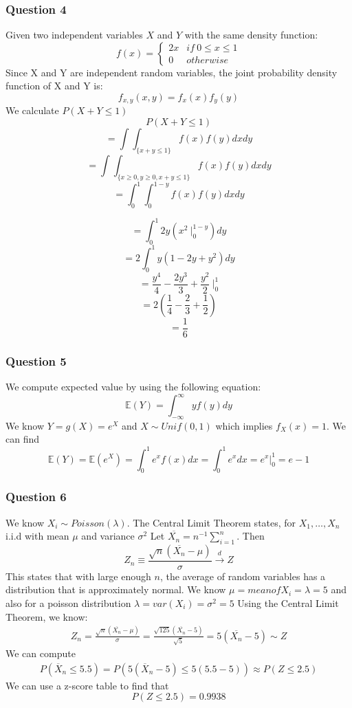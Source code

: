 \documentclass{article}
\begin{document}
\subsubsection*{Question 4}
Given two independent variables $X$ and $Y$ with the same density function:
\begin{equation}
  f(x) = \left\{
  \begin{array}{cl}
    2x & if \ 0 \leq x \leq 1\\
    0  & otherwise
  \end{array}
  \right.
\end{equation}
Since X and Y are independent random variables, the joint probability density function of X
and Y is:
\begin{equation}
  f_{x,y}(x,y) = f_x(x)f_y(y)
\end{equation}
We calculate $P(X+Y \leq 1)$
\[P(X + Y \leq 1)\]
\[= \int\int_{\{x+y\leq 1\}}f(x)f(y)dxdy\]
\[= \int\int_{\{x\geq 0, y\geq 0, x+y\leq 1\}}f(x)f(y)dxdy\]
\[= \int_0^1\int_0^{1-y}f(x)f(y)dxdy\]

\[= \int_0^1 2y(x^2 \ \bigg|_0^{1-y})dy\]
\[= 2\int_0^1 y(1-2y+y^2)dy\]
\[= \frac{y^4}{4}-\frac{2y^3}{3}+\frac{y^2}{2} \ \bigg|_0^1\]
\[= 2(\frac{1}{4} - \frac{2}{3} + \frac{1}{2})\]
\[= \frac{1}{6}\]
\subsubsection*{Question 5}
We compute expected value by using the following equation:
\begin{equation}
  \mathbb{E}(Y) = \int_{-\infty}^{\infty}yf(y)dy
\end{equation}
We know $Y = g(X) = e^X$ and $X \sim Unif(0,1)$ which implies $f_X(x) = 1$.
We can find 
\[\mathbb{E}(Y) = \mathbb{E}(e^X) = \int_{0}^{1}e^xf(x)dx = \int_0^1e^xdx = e^x\bigg|_0^1 = e-1 \]

\subsubsection*{Question 6}
We know $X_i \sim Poisson(\lambda)$. The Central Limit Theorem states, for $X_1, \ldots , X_n$
i.i.d with mean $\mu $ and variance ${\sigma}^2$ Let $\overline{X_n} = n^{-1}\sum_{i=1}^n$. Then
\begin{equation}
  Z_n \equiv \frac{\sqrt{n}(\overline{X_n}-\mu)}{\sigma} \xrightarrow{d} Z
\end{equation}
This states that with large enough $n$, the average of random variables has a distribution
that is approximately normal.
\newline
We know $\mu = mean of X_i = \lambda = 5$ and also for a poisson distribution $\lambda = var(X_i) = \sigma^2 = 5$
Using the Central Limit Theorem, we know:
\begin{align}
  Z_n = \frac{\sqrt{n}(\overline{X_n}-\mu)}{\sigma} = \frac{\sqrt{125}(\overline{X_n}-5)}{\sqrt{5}} = 5(\overline{X_n}-5) \sim Z
\end{align}
We can compute
\begin{align}
  P(\overline{X}_n \leq 5.5) = P(5(\overline{X}_n - 5) \leq 5(5.5-5)) \approx P(Z \leq 2.5)
\end{align}
We can use a z-score table to find that
\[P(Z\leq 2.5) = 0.9938\]
\end{document}
